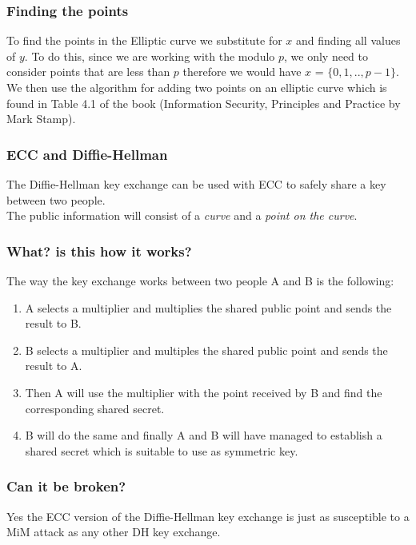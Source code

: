 \documentclass{article}
\begin{document}
\subsubsection{Finding the points}
To find the points in the Elliptic curve we substitute for $x$ and finding all values of $y$. To do this, since we are working with the modulo $p$, we only need to consider points that are less than $p$ therefore we would have $x$ = $\{0,1,..,p-1\}$.\\
We then use the algorithm for adding two points on an elliptic curve which is found in Table 4.1 of the book (Information Security, Principles and Practice by Mark Stamp).

\subsubsection{ECC and Diffie-Hellman}
The Diffie-Hellman key exchange can be used with ECC to safely share a key between two people.\\
The public information will consist of a \textit{curve} and a \textit{point on the curve}.

\subsubsection{What? is this how it works?}
The way the key exchange works between two people A and B is the following:
\begin{enumerate}
    \item A selects a multiplier and multiplies the shared public point and sends the result to B.
    \item B selects a multiplier and multiples the shared public point and sends the result to A.
    \item Then A will use the multiplier with the point received by B and find the corresponding shared secret.
    \item B will do the same and finally A and B will have managed to establish a shared secret which is suitable to use as symmetric key.
\end{enumerate}{}

\subsubsection{Can it be broken?}
Yes the ECC version of the Diffie-Hellman key exchange is just as susceptible to a MiM attack as any other DH key exchange.

\newpage
\end{document}
